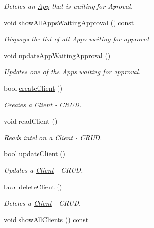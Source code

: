 \begin{DoxyCompactItemize}
\begin{DoxyCompactList}\small\item\em Deletes an \hyperlink{class_app}{App} that is waiting for Aproval. \end{DoxyCompactList}\item 
void \hyperlink{class_app_store_aa3dcdac081b1e94a59ea9c03a93f9a72}{show\-All\-Apps\-Waiting\-Approval} () const 
\begin{DoxyCompactList}\small\item\em Displays the list of all Apps waiting for approval. \end{DoxyCompactList}\item 
void \hyperlink{class_app_store_a8a1bd45c8da47c28c573fee0ceb3720a}{update\-App\-Waiting\-Approval} ()
\begin{DoxyCompactList}\small\item\em Updates one of the Apps waiting for approval. \end{DoxyCompactList}\item 
bool \hyperlink{class_app_store_ab9ae4acba7e7bf74e92e9dfb083acd4b}{create\-Client} ()
\begin{DoxyCompactList}\small\item\em Creates a \hyperlink{class_client}{Client} -\/ C\-R\-U\-D. \end{DoxyCompactList}\item 
void \hyperlink{class_app_store_aecb3bdf89a8b5d772c6677816731763d}{read\-Client} ()
\begin{DoxyCompactList}\small\item\em Reads intel on a \hyperlink{class_client}{Client} -\/ C\-R\-U\-D. \end{DoxyCompactList}\item 
bool \hyperlink{class_app_store_a2c03b4be04c9b3e8ff063b3372941b5c}{update\-Client} ()
\begin{DoxyCompactList}\small\item\em Updates a \hyperlink{class_client}{Client} -\/ C\-R\-U\-D. \end{DoxyCompactList}\item 
bool \hyperlink{class_app_store_a45233b575b02d5337bf8837844e771b5}{delete\-Client} ()
\begin{DoxyCompactList}\small\item\em Deletes a \hyperlink{class_client}{Client} -\/ C\-R\-U\-D. \end{DoxyCompactList}\item 
void \hyperlink{class_app_store_ad8d1df5f575e231df889328b501d836d}{show\-All\-Clients} () const 

\end{DoxyCompactItemize}

